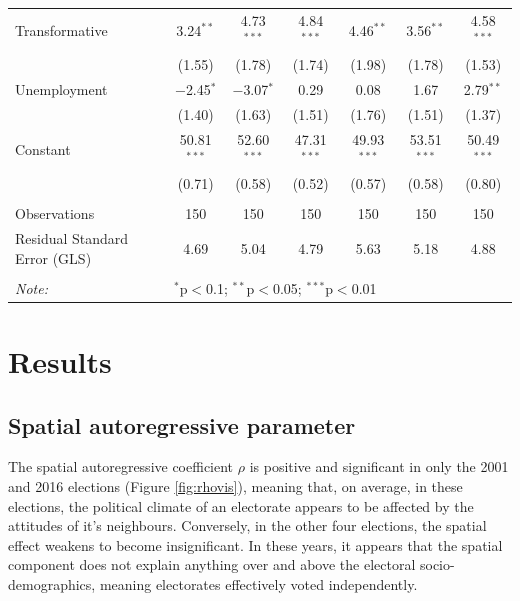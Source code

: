 \documentclass[11pt,a4paper,]{article}
\begin{document}
\begin{table}[!htbp]
\begin{tabular}{@{\extracolsep{1pt}}lcccccc}
 Transformative & 3.24$^{**}$ & 4.73$^{***}$ & 4.84$^{***}$ & 4.46$^{**}$ & 3.56$^{**}$ & 4.58$^{***}$ \\ 
  & (1.55) & (1.78) & (1.74) & (1.98) & (1.78) & (1.53) \\ 

 Unemployment & $-$2.45$^{*}$ & $-$3.07$^{*}$ & 0.29 & 0.08 & 1.67 & 2.79$^{**}$ \\ 
  & (1.40) & (1.63) & (1.51) & (1.76) & (1.51) & (1.37) \\ 

 Constant & 50.81$^{***}$ & 52.60$^{***}$ & 47.31$^{***}$ & 49.93$^{***}$ & 53.51$^{***}$ & 50.49$^{***}$ \\ 
  & (0.71) & (0.58) & (0.52) & (0.57) & (0.58) & (0.80) \\ 

\hline \\[-1.8ex] 
Observations & 150 & 150 & 150 & 150 & 150 & 150 \\ 
Residual Standard Error (GLS) & 4.69 & 5.04 & 4.79 & 5.63 & 5.18 & 4.88 \\ 
\hline 
\hline \\[-1.8ex] 
\textit{Note:}  & \multicolumn{6}{l}{$^{*}$p$<$0.1; $^{**}$p$<$0.05; $^{***}$p$<$0.01} \\ 
\end{tabular} 
\end{table}

\newpage

\hypertarget{results}{%
\section{Results}\label{results}}

\hypertarget{spatial-autoregressive-parameter}{%
\subsection{Spatial autoregressive parameter}\label{spatial-autoregressive-parameter}}

The spatial autoregressive coefficient \(\rho\) is positive and significant in only the 2001 and 2016 elections (Figure \ref{fig:rhovis}), meaning that, on average, in these elections, the political climate of an electorate appears to be affected by the attitudes of it's neighbours. Conversely, in the other four elections, the spatial effect weakens to become insignificant. In these years, it appears that the spatial component does not explain anything over and above the electoral socio-demographics, meaning electorates effectively voted independently.
\end{document}

